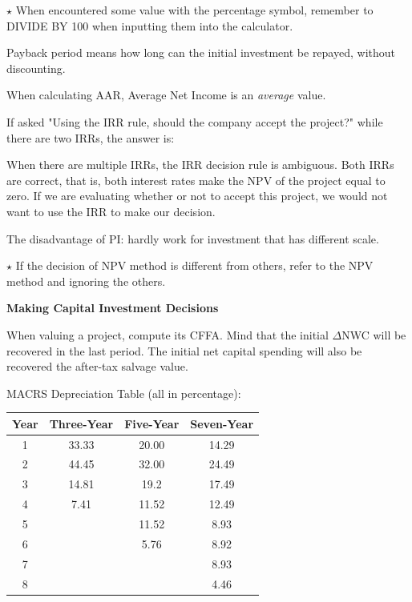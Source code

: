 \documentclass{article}
\newcommand{\bigtitle}[1]{
	\noindent
	\textbf{#1}
}
\begin{document}
\color{red}
$\star$ When encountered some value with the percentage symbol, remember to DIVIDE BY 100 when inputting them into the calculator.
\color{black}

Payback period means how long can the initial investment be repayed, without discounting.

When calculating AAR, Average Net Income is an \textit{average} value. 

If asked "Using the IRR rule, should the company accept the project?" while there are two IRRs, the answer is:

When there are multiple IRRs, the IRR decision rule is ambiguous. Both IRRs are correct, that is, both interest rates make the NPV of the project equal to zero. If we are evaluating whether or not to accept this project, we would not want to use the IRR to make our decision.

The disadvantage of PI: hardly work for investment that has different scale.

$\star$ If the decision of NPV method is different from others, refer to the NPV method and ignoring the others.



\bigtitle{Making Capital Investment Decisions}

When valuing a project, compute its CFFA. Mind that the initial $\Delta$NWC will be recovered in the last period.
The initial net capital spending will also be recovered the after-tax salvage value.

MACRS Depreciation Table (all in percentage):

\vspace{-1em}

\begin{table}[htb]
	\centering
	\begin{tabular}{cccc}
		Year & Three-Year & Five-Year & Seven-Year \\\hline
		1    & 33.33      & 20.00     & 14.29      \\
		2    & 44.45      & 32.00     & 24.49      \\
		3    & 14.81      & 19.2      & 17.49      \\
		4    & 7.41       & 11.52     & 12.49      \\
		5    &            & 11.52     & 8.93       \\
		6    &            & 5.76      & 8.92       \\
		7    &            &           & 8.93       \\
		8    &            &           & 4.46      
	\end{tabular}
\end{table}
\end{document}
